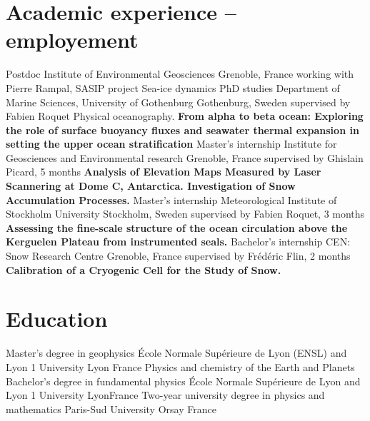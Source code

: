 \documentclass[11pt,a4paper,roman]{moderncv}
\begin{document}
\makecvtitle

\vspace*{0.5cm}

\section{Academic experience -- employement}
        {Postdoc}
        {Institute of Environmental Geosciences}
        {Grenoble, France}
        {working with Pierre Rampal, SASIP project}
        {Sea-ice dynamics}
        {PhD studies}
        {Department of Marine Sciences, University of Gothenburg}
        {Gothenburg, Sweden}
        {supervised by Fabien Roquet}
        {Physical oceanography.
          \textbf{From alpha to beta ocean: Exploring the role of surface buoyancy fluxes and seawater thermal expansion in setting the upper ocean stratification}
        }
        {Master's internship}
        {Institute for Geosciences and Environmental research}
        {Grenoble, France}
        {supervised by Ghislain Picard, 5 months}
        {\textbf{Analysis of Elevation Maps Measured by Laser Scannering at
            Dome C, Antarctica. Investigation of Snow Accumulation Processes.}}
        {Master's internship}
        {Meteorological Institute of Stockholm University}
        {Stockholm, Sweden}
        {supervised by Fabien Roquet, 3 months}
        {\textbf{Assessing the fine-scale structure of the ocean
            circulation above the Kerguelen Plateau from instrumented seals.}}
        {Bachelor's internship}
        {CEN: Snow Research Centre}
        {Grenoble, France}
        {supervised by Frédéric Flin, 2 months}
        {\textbf{Calibration of a Cryogenic Cell for the Study of Snow.}}



\section{Education}
        {Master's degree in geophysics}
        {École Normale Supérieure de Lyon (ENSL) and Lyon 1 University}
        {Lyon}
        {France}
        {Physics and chemistry of the Earth and Planets}
        {Bachelor's degree in fundamental physics}
        {École Normale Supérieure de Lyon and Lyon 1 University}
        {Lyon}{France}{}
        {Two-year university degree in physics and mathematics}
        {Paris-Sud University}
        {Orsay}
        {France}
        {}
\end{document}
